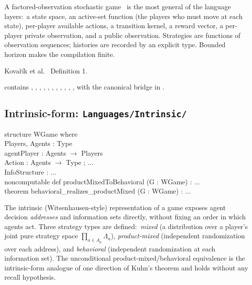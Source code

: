 \Mathematical
A factored-observation stochastic game~\citep{Kovarik2022} is the
most general of the language layers:\ a state space, an active-set
function (the players who must move at each state), per-player
available actions, a transition kernel, a reward vector, a per-
player private observation, and a public observation.  Strategies
are functions of observation sequences; histories are recorded by
an explicit  type.  Bounded horizon makes the
compilation finite.

\Textbook
Kovařík et al.~\citep{Kovarik2022} Definition 1.

\Variants
{} contains , ,
, , ,
, , ,
, , , with the
canonical  bridge in .

\subsection{Intrinsic-form: \texttt{Languages/Intrinsic/}}
\label{sec:supp:intrinsic}

\begin{leanbox}
structure WGame where\\
\bd Players, Agents : Type\\
\bd agentPlayer : Agents $\to$ Players\\
\bd Action : Agents $\to$ Type ; ...\\
\bd InfoStructure : ...\\[3pt]
noncomputable def productMixedToBehavioral (G : WGame) : ...\\
theorem behavioral\_realizes\_productMixed (G : WGame) : ...
\end{leanbox}

\Mathematical
The intrinsic (Witsenhausen-style) representation of a game
\citep{HeymannDeLaraChancelier2020} exposes agent decision
\emph{addresses} and information sets directly, without fixing an
order in which agents act.  Three strategy types are defined:\
\emph{mixed} (a distribution over a player's joint pure strategy
space $\prod_{a \in A_p} \Lambda_a$), \emph{product-mixed}
(independent randomization over each address), and
\emph{behavioral} (independent randomization at each information
set).  The unconditional product-mixed/behavioral equivalence is
the intrinsic-form analogue of one direction of Kuhn's theorem and
holds without any recall hypothesis.

